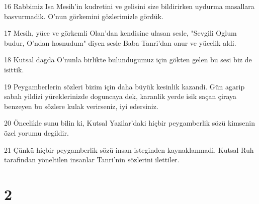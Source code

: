 \par 16 Rabbimiz Isa Mesih'in kudretini ve gelisini size bildirirken uydurma masallara basvurmadik. O'nun görkemini gözlerimizle gördük.
\par 17 Mesih, yüce ve görkemli Olan'dan kendisine ulasan sesle, "Sevgili Oglum budur, O'ndan hosnudum" diyen sesle Baba Tanri'dan onur ve yücelik aldi.
\par 18 Kutsal dagda O'nunla birlikte bulundugumuz için gökten gelen bu sesi biz de isittik.
\par 19 Peygamberlerin sözleri bizim için daha büyük kesinlik kazandi. Gün agarip sabah yildizi yüreklerinizde doguncaya dek, karanlik yerde isik saçan çiraya benzeyen bu sözlere kulak verirseniz, iyi edersiniz.
\par 20 Öncelikle sunu bilin ki, Kutsal Yazilar'daki hiçbir peygamberlik sözü kimsenin özel yorumu degildir.
\par 21 Çünkü hiçbir peygamberlik sözü insan isteginden kaynaklanmadi. Kutsal Ruh tarafindan yöneltilen insanlar Tanri'nin sözlerini ilettiler.

\chapter{2}

